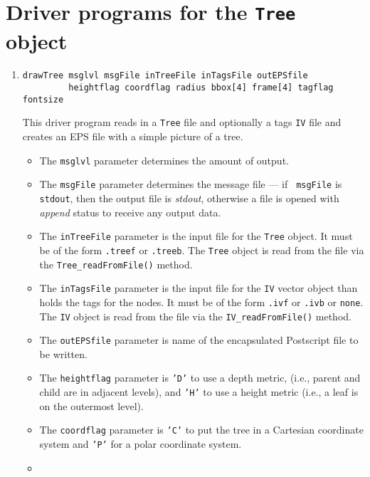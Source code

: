 \par
\section{Driver programs for the {\tt Tree} object}
\label{section:Tree:drivers}
\par
\begin{enumerate}
\item
\begin{verbatim}
drawTree msglvl msgFile inTreeFile inTagsFile outEPSfile
         heightflag coordflag radius bbox[4] frame[4] tagflag fontsize
\end{verbatim}
This driver program reads in a {\tt Tree} file and optionally a
tags {\tt IV} file and creates an EPS file with a simple
picture of a tree.
\par
\begin{itemize}
\item
The {\tt msglvl} parameter determines the amount of output.
\item
The {\tt msgFile} parameter determines the message file --- if {\tt
msgFile} is {\tt stdout}, then the output file is {\it stdout},
otherwise a file is opened with {\it append} status to receive any
output data.
\item
The {\tt inTreeFile} parameter is the input file for the {\tt Tree}
object. It must be of the form {\tt *.treef} or {\tt *.treeb}.
The {\tt Tree} object is read from the file via the
{\tt Tree\_readFromFile()} method.
\item
The {\tt inTagsFile} parameter is the input file for the {\tt IV}
vector object than holds the tags for the nodes. 
It must be of the form {\tt *.ivf} or {\tt *.ivb} or {\tt none}.
The {\tt IV} object is read from the file via the
{\tt IV\_readFromFile()} method.
\item
The {\tt outEPSfile} parameter is name of the
encapsulated Postscript file to be written.
\item
The {\tt heightflag} parameter is {\tt 'D'} to use a depth metric,
(i.e., parent and child are in adjacent levels),
and {\tt 'H'} to use a height metric (i.e., a leaf is on the
outermost level).
\item
The {\tt coordflag} parameter is {\tt 'C'} to put the tree in a
Cartesian coordinate system and {\tt 'P'} for a polar coordinate
system.
\item

\end{itemize}
\end{enumerate}
